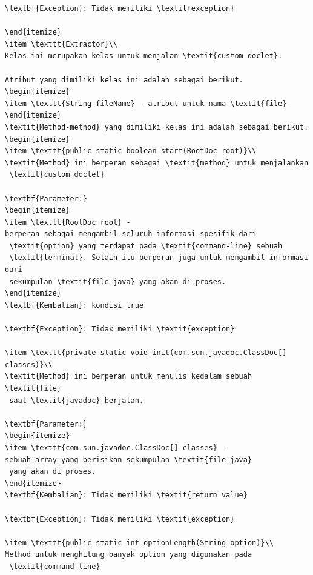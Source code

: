 \documentclass[a4paper,twoside]{article}
\begin{document}
\begin{enumerate}
\begin{lstlisting}[caption=Hasil Pengujian Kedua]
\textbf{Exception}: Tidak memiliki \textit{exception}

\end{itemize}
\item \texttt{Extractor}\\ 
Kelas ini merupakan kelas untuk menjalan \textit{custom doclet}.

Atribut yang dimiliki kelas ini adalah sebagai berikut.
\begin{itemize}
\item \texttt{String fileName} - atribut untuk nama \textit{file}
\end{itemize}
\textit{Method-method} yang dimiliki kelas ini adalah sebagai berikut.
\begin{itemize}
\item \texttt{public static boolean start(RootDoc root)}\\ 
\textit{Method} ini berperan sebagai \textit{method} untuk menjalankan
 \textit{custom doclet}

\textbf{Parameter:}
\begin{itemize}
\item \texttt{RootDoc root} - 
berperan sebagai mengambil seluruh informasi spesifik dari
 \textit{option} yang terdapat pada \textit{command-line} sebuah
 \textit{terminal}. Selain itu berperan juga untuk mengambil informasi dari
 sekumpulan \textit{file java} yang akan di proses.
\end{itemize}
\textbf{Kembalian}: kondisi true

\textbf{Exception}: Tidak memiliki \textit{exception}

\item \texttt{private static void init(com.sun.javadoc.ClassDoc[] classes)}\\ 
\textit{Method} ini berperan untuk menulis kedalam sebuah \textit{file}
 saat \textit{javadoc} berjalan.

\textbf{Parameter:}
\begin{itemize}
\item \texttt{com.sun.javadoc.ClassDoc[] classes} - 
sebuah array yang berisikan sekumpulan \textit{file java}
 yang akan di proses.
\end{itemize}
\textbf{Kembalian}: Tidak memiliki \textit{return value}

\textbf{Exception}: Tidak memiliki \textit{exception}

\item \texttt{public static int optionLength(String option)}\\ 
Method untuk menghitung banyak option yang digunakan pada
 \textit{command-line}


\end{lstlisting}
\end{enumerate}
\end{document}
